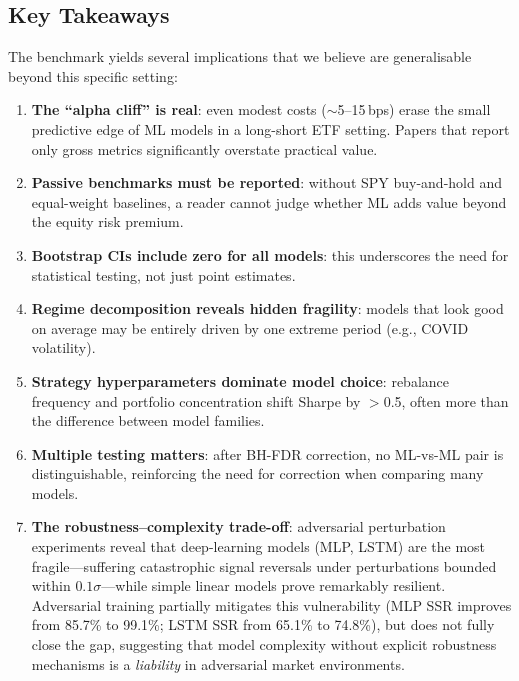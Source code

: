 \documentclass[preprint,review,12pt]{elsarticle}
\begin{document}
\subsection{Key Takeaways}

The benchmark yields several implications that we believe are generalisable beyond this specific setting:

\begin{enumerate}[leftmargin=1.6em]
  \item \textbf{The ``alpha cliff'' is real}: even modest costs ($\sim$5--15\,bps) erase the small predictive edge of ML models in a long-short ETF setting. Papers that report only gross metrics significantly overstate practical value.

  \item \textbf{Passive benchmarks must be reported}: without SPY buy-and-hold and equal-weight baselines, a reader cannot judge whether ML adds value beyond the equity risk premium.

  \item \textbf{Bootstrap CIs include zero for all models}: this underscores the need for statistical testing, not just point estimates.

  \item \textbf{Regime decomposition reveals hidden fragility}: models that look good on average may be entirely driven by one extreme period (e.g., COVID volatility).

  \item \textbf{Strategy hyperparameters dominate model choice}: rebalance frequency and portfolio concentration shift Sharpe by $>$0.5, often more than the difference between model families.

  \item \textbf{Multiple testing matters}: after BH-FDR correction, no ML-vs-ML pair is distinguishable, reinforcing the need for correction when comparing many models.

  \item \textbf{The robustness--complexity trade-off}: adversarial perturbation experiments reveal that deep-learning models (MLP, LSTM) are the most fragile---suffering catastrophic signal reversals under perturbations bounded within $0.1\sigma$---while simple linear models prove remarkably resilient. Adversarial training partially mitigates this vulnerability (MLP SSR improves from 85.7\% to 99.1\%; LSTM SSR from 65.1\% to 74.8\%), but does not fully close the gap, suggesting that model complexity without explicit robustness mechanisms is a \emph{liability} in adversarial market environments.


\end{enumerate}
\end{document}
